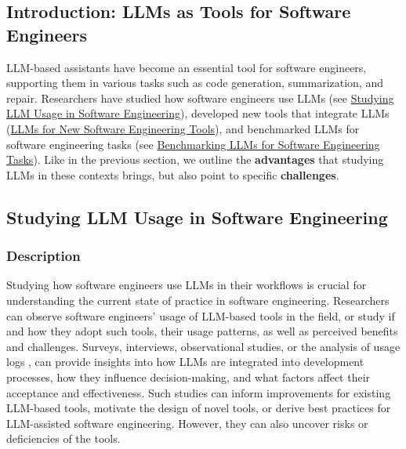 
\subsection{Introduction: LLMs as Tools for Software Engineers}

LLM-based assistants have become an essential tool for software engineers, supporting them in various tasks such as code generation, summarization, and repair.
Researchers have studied how software engineers use LLMs (see \href{/study-types/#studying-llm-usage-in-software-engineering}{Studying LLM Usage in Software Engineering}), developed new tools that integrate LLMs (\href{/study-types/#llms-for-new-software-engineering-tools}{LLMs for New Software Engineering Tools}), and benchmarked LLMs for software engineering tasks  (see \href{/study-types/#benchmarking-llms-for-software-engineering-tasks}{Benchmarking LLMs for Software Engineering Tasks}).
Like in the previous section, we outline the \textbf{advantages} that studying LLMs in these contexts brings, but also point to specific \textbf{challenges}.
\subsection{Studying LLM Usage in Software Engineering}

\subsubsection{Description}

Studying how software engineers use LLMs in their workflows is crucial for understanding the current state of practice in software engineering.
Researchers can observe software engineers' usage of LLM-based tools in the field, or study if and how they adopt such tools, their usage patterns, as well as perceived benefits and challenges.
Surveys, interviews, observational studies, or the analysis of usage logs , can provide insights into how LLMs are integrated into development processes, how they influence decision-making, and what factors affect their acceptance and effectiveness. 
Such studies can inform improvements for existing LLM-based tools, motivate the design of novel tools, or derive best practices for LLM-assisted software engineering.
However, they can also uncover risks or deficiencies of the tools.

